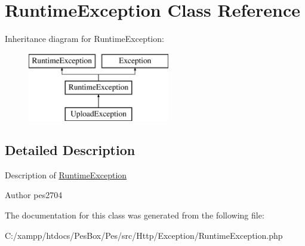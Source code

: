 \hypertarget{class_pes_1_1_http_1_1_exception_1_1_runtime_exception}{}\section{Runtime\+Exception Class Reference}
\label{class_pes_1_1_http_1_1_exception_1_1_runtime_exception}
Inheritance diagram for Runtime\+Exception\+:\begin{figure}[H]
\begin{center}
\leavevmode
\includegraphics[height=3.000000cm]{class_pes_1_1_http_1_1_exception_1_1_runtime_exception}
\end{center}
\end{figure}


\subsection{Detailed Description}
Description of \mbox{\hyperlink{class_pes_1_1_http_1_1_exception_1_1_runtime_exception}{Runtime\+Exception}}

\begin{DoxyAuthor}{Author}
pes2704 
\end{DoxyAuthor}


The documentation for this class was generated from the following file\+:\begin{DoxyCompactItemize}
\item 
C\+:/xampp/htdocs/\+Pes\+Box/\+Pes/src/\+Http/\+Exception/Runtime\+Exception.\+php\end{DoxyCompactItemize}
